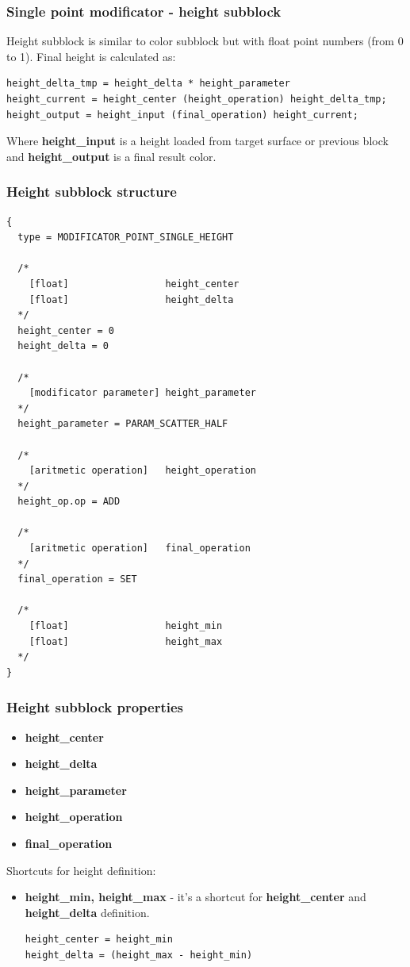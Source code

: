 \documentclass[9pt]{article}
\begin{document}
\subsubsection{Single point modificator - height subblock}

Height subblock is similar to color subblock but
with float point numbers (from 0 to 1). Final height
is calculated as:
\begin{verbatim}
height_delta_tmp = height_delta * height_parameter
height_current = height_center (height_operation) height_delta_tmp;
height_output = height_input (final_operation) height_current;
\end{verbatim}
Where {\bf height\_input} is a height loaded from target surface or previous
block and {\bf height\_output} is a final result color.

\subsubsection*{Height subblock structure}
\begin{verbatim}
{
  type = MODIFICATOR_POINT_SINGLE_HEIGHT

  /*    
    [float]                 height_center
    [float]                 height_delta
  */
  height_center = 0
  height_delta = 0

  /*
    [modificator parameter] height_parameter
  */  
  height_parameter = PARAM_SCATTER_HALF
  
  /*  
    [aritmetic operation]   height_operation
  */
  height_op.op = ADD
  
  /*  
    [aritmetic operation]   final_operation
  */
  final_operation = SET
  
  /*
    [float]                 height_min
    [float]                 height_max    
  */  
}
\end{verbatim}
\subsubsection*{Height subblock properties}
\begin{itemize}
\item{\bf height\_center}
\item{\bf height\_delta}
\item{\bf height\_parameter}
\item{\bf height\_operation}
\item{\bf final\_operation}
\end{itemize}
Shortcuts for height definition:
\begin{itemize}
\item{\bf height\_min, height\_max} - it's a shortcut for {\bf height\_center} and 
{\bf height\_delta} definition.
\begin{verbatim}
height_center = height_min
height_delta = (height_max - height_min)
\end{verbatim}
\end{itemize}
\end{document}
